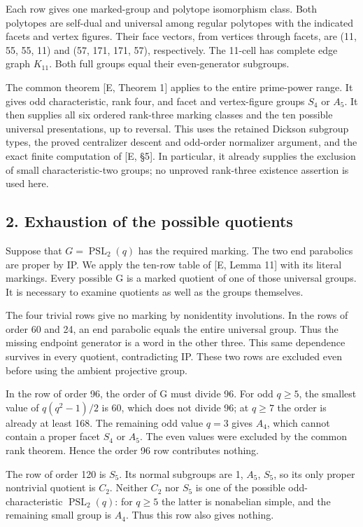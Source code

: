 \documentclass[
  11pt,
  a4paper,
]{article}
\begin{document}
Each row gives one marked-group and polytope isomorphism class. Both
polytopes are self-dual and universal among regular polytopes with the
indicated facets and vertex figures. Their face vectors, from vertices
through facets, are (11, 55, 55, 11) and (57, 171, 171, 57),
respectively. The 11-cell has complete edge graph \(K_{11}\). Both full
groups equal their even-generator subgroups.

The common theorem {[}E, Theorem 1{]} applies to the entire prime-power
range. It gives odd characteristic, rank four, and facet and
vertex-figure groups \(S_4\) or \(A_5\). It then supplies all six
ordered rank-three marking classes and the ten possible universal
presentations, up to reversal. This uses the retained Dickson subgroup
types, the proved centralizer descent and odd-order normalizer argument,
and the exact finite computation of {[}E, §5{]}. In particular, it
already supplies the exclusion of small characteristic-two groups; no
unproved rank-three existence assertion is used here.

\subsection{2. Exhaustion of the possible
quotients}\label{exhaustion-of-the-possible-quotients}

Suppose that \(G=\operatorname{PSL}_2(q)\) has the required marking. The
two end parabolics are proper by IP. We apply the ten-row table of {[}E,
Lemma 11{]} with its literal markings. Every possible G is a marked
quotient of one of those universal groups. It is necessary to examine
quotients as well as the groups themselves.

The four trivial rows give no marking by nonidentity involutions. In the
rows of order 60 and 24, an end parabolic equals the entire universal
group. Thus the missing endpoint generator is a word in the other three.
This same dependence survives in every quotient, contradicting IP. These
two rows are excluded even before using the ambient projective group.

In the row of order 96, the order of G must divide 96. For odd
\(q\ge 5\), the smallest value of \(q(q^2-1)/2\) is 60, which does not
divide 96; at \(q\ge 7\) the order is already at least 168. The
remaining odd value \(q=3\) gives \(A_4\), which cannot contain a proper
facet \(S_4\) or \(A_5\). The even values were excluded by the common
rank theorem. Hence the order 96 row contributes nothing.

The row of order 120 is \(S_5\). Its normal subgroups are 1, \(A_5\),
\(S_5\), so its only proper nontrivial quotient is \(C_2\). Neither
\(C_2\) nor \(S_5\) is one of the possible odd-characteristic
\(\operatorname{PSL}_2(q)\): for \(q\ge 5\) the latter is nonabelian
simple, and the remaining small group is \(A_4\). Thus this row also
gives nothing.
\end{document}
